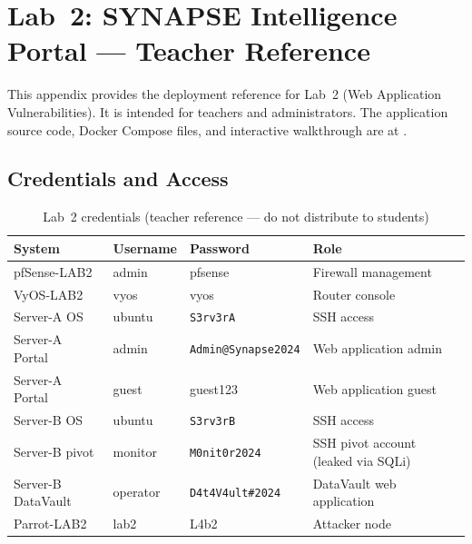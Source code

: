 
\chapter{Lab~2: SYNAPSE Intelligence Portal --- Teacher Reference}
\label{app:lab2}

This appendix provides the deployment reference for Lab~2 (Web Application
Vulnerabilities). It is intended for teachers and administrators. The
application source code, Docker Compose files, and interactive walkthrough
are at .

\section*{Credentials and Access}

\begin{table}[H]
\centering
\begin{tabularx}{\textwidth}{lll>{\raggedright\arraybackslash}X}
\toprule
\textbf{System} & \textbf{Username} & \textbf{Password} & \textbf{Role} \\
\midrule
pfSense-LAB2         & admin     & pfsense              & Firewall management \\
VyOS-LAB2            & vyos      & vyos                 & Router console \\
Server-A OS          & ubuntu    & \texttt{S3rv3rA}     & SSH access \\
Server-A Portal      & admin     & \texttt{Admin@Synapse2024} & Web application admin \\
Server-A Portal      & guest     & guest123             & Web application guest \\
Server-B OS          & ubuntu    & \texttt{S3rv3rB}     & SSH access \\
Server-B pivot       & monitor   & \texttt{M0nit0r2024}      & SSH pivot account (leaked via SQLi) \\
Server-B DataVault   & operator  & \texttt{D4t4V4ult\#2024}  & DataVault web application \\
Parrot-LAB2          & lab2      & L4b2                 & Attacker node \\
\bottomrule
\end{tabularx}
\caption{Lab~2 credentials (teacher reference --- do not distribute to students)}
\label{tab:lab2-creds}
\end{table}


